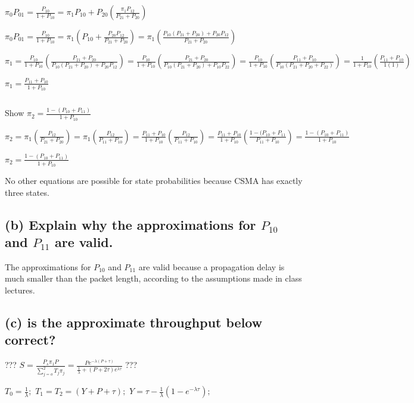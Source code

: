 \documentclass[12pt]{article}
\begin{document}
 $\pi_0P_{01} = \frac{P_{10}}{1+P_{10}} = \pi_1P_{10} + P_{20}(\frac{\pi_1P_{12}} {P_{21}+P_{20}})$

   $\pi_0P_{01} = \frac{P_{10}}{1+P_{10}} = \pi_1(P_{10} + \frac{P_{20}P_{12}} {P_{21}+P_{20}}) = \pi_1(\frac{P_{10}(P_{21}+P_{20}) + P_{20}P_{12}} {P_{21}+P_{20}})$

$\pi_1 = \frac{P_{10}}{1+P_{10}} (\frac  {P_{21}+P_{20}} {P_{10}(P_{21}+P_{20}) + P_{20}P_{12}} ) = \frac{P_{10}}{1+P_{10}} (\frac  {P_{21}+P_{20}} {P_{10}(P_{21}+P_{20}) + P_{10}P_{22}} ) = \frac{P_{10}}{1+P_{10}} (\frac  {P_{11}+P_{10}} {P_{10}(P_{21}+P_{20} + P_{22}) } ) = \frac{1}{1+P_{10}} (\frac  {P_{11}+P_{10}} {1(1) } ) $

$\pi_1 = \frac{P_{11}+P_{10}} {1+P_{10}}$

${ }$

Show  $\pi_2 = \frac{1-(P_{10}+P_{11})}{1+P_{10}}$

$\pi_2 = \pi_1(\frac{P_{12}}{P_{21}+P_{20}}) = \pi_1(\frac{P_{12}}{P_{11}+P_{10}}) = \frac{P_{11}+P_{10}} {1+P_{10}} (\frac{P_{12}}{P_{11}+P_{10}}) = \frac{P_{11}+P_{10}} {1+P_{10}} (\frac{1-(P_{10}+P_{11}}{P_{11}+P_{10}}) = \frac{1-(P_{10}+P_{11})} {1+P_{10}} $

$\pi_2 = \frac{1-(P_{10}+P_{11})} {1+P_{10}} $

No other equations are possible for state probabilities because CSMA has exactly three states.  

  \subsection*{(b) Explain why the approximations for $P_{10}$ and $P_{11}$ are valid. }
  
 The approximations for $P_{10}$ and $P_{11}$ are valid because a propagation delay is much smaller than the packet length, according to the assumptions made in class lectures.  

  \subsection*{(c) is the approximate throughput below correct? }
  
  ??? $S = \displaystyle\frac {P_s \pi_1 P} {\displaystyle  \sum_{j=o}^{2}  T_j \pi_j}  = \displaystyle\frac { P e^{-\lambda(P+\tau)} } { \frac 1 \lambda + (P+2\tau)e^{\lambda\tau}} $ ???
  
  $T_0 = \frac 1 \lambda;$  ${ } { } T_1 = T_2 = (Y + P + \tau);$   $Y = \tau - \frac 1 \lambda (1-e^{-\lambda\tau}); $
  
\end{document}
